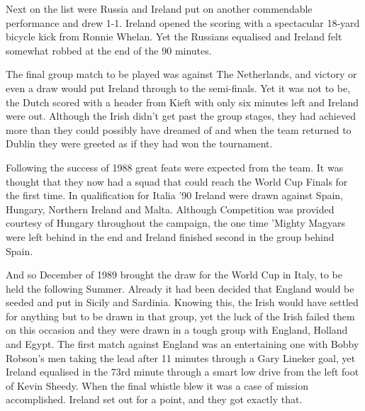 Next on the list were Russia and Ireland put on another commendable performance
and drew 1-1. Ireland opened the scoring with a spectacular 18-yard bicycle 
kick from Ronnie Whelan. Yet the Russians equalised and Ireland felt somewhat 
robbed at the end of the 90 minutes.  

The final group match to be played was against The Netherlands, and victory or 
even a draw would put Ireland through to the semi-finals. Yet it was not to be,
the Dutch scored with a header from Kieft with only six minutes left and 
Ireland were out. Although the Irish didn't get past the group stages, they had
achieved more than they could possibly have dreamed of and when the team 
returned to Dublin they were greeted as if they had won the tournament.

Following the success of 1988 great feats were expected from the team. It was 
thought that they now had a squad that could reach the World Cup Finals for the
first time. In qualification for Italia '90 Ireland were drawn against Spain, 
Hungary, Northern Ireland and Malta. Although Competition was provided courtesy
of Hungary throughout the campaign, the one time 'Mighty Magyars were left 
behind in the end and Ireland finished second in the group behind Spain.

And so December of 1989 brought the draw for the World Cup in Italy, to be held
the following Summer. Already it had been decided that England would be seeded
and put in Sicily and Sardinia. Knowing this, the Irish would have settled for
anything but to be drawn in that group, yet the luck of the Irish failed them
on this occasion and they were drawn in a tough group with England, Holland
and Egypt. The first match against England was an entertaining one with 
Bobby Robson's men taking the lead after 11 minutes through a Gary Lineker 
goal, yet Ireland equalised in the 73rd minute through a smart low drive from 
the left foot of Kevin Sheedy. When the final whistle blew it was a case of 
mission accomplished. Ireland set out for a point, and they got exactly that.

